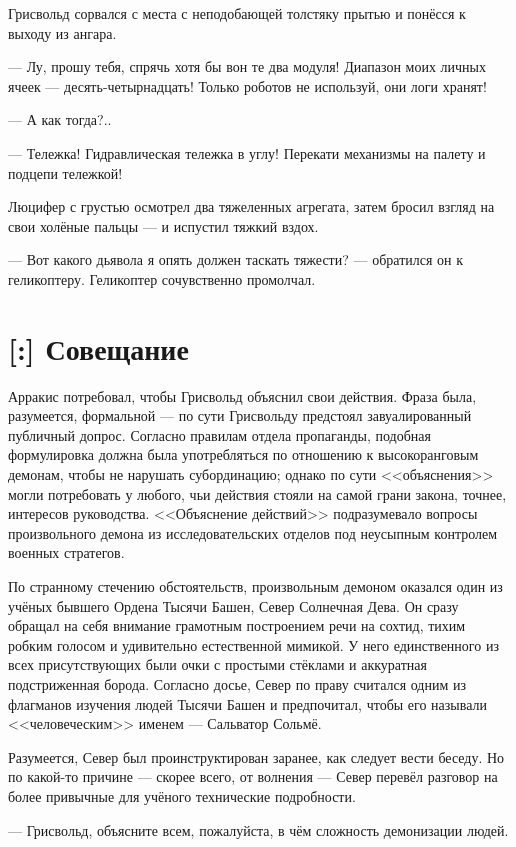 Грисвольд сорвался с места с неподобающей толстяку прытью и понёсся к выходу из ангара.

--- Лу, прошу тебя, спрячь хотя бы вон те два модуля!
Диапазон моих личных ячеек --- десять-четырнадцать!
Только роботов не используй, они логи хранят!

--- А как тогда?..

--- Тележка!
Гидравлическая тележка в углу!
Перекати механизмы на палету и подцепи тележкой!

Люцифер с грустью осмотрел два тяжеленных агрегата, затем бросил взгляд на свои холёные пальцы --- и испустил тяжкий вздох.

--- Вот какого дьявола я опять должен таскать тяжести? --- обратился он к геликоптеру.
Геликоптер сочувственно промолчал.

\section{[:] Совещание}

\textspace

Арракис потребовал, чтобы Грисвольд объяснил свои действия.
Фраза была, разумеется, формальной --- по сути Грисвольду предстоял завуалированный публичный допрос.
Согласно правилам отдела пропаганды, подобная формулировка должна была употребляться по отношению к высокоранговым демонам, чтобы не нарушать субординацию;
однако по сути <<объяснения>> могли потребовать у любого, чьи действия стояли на самой грани закона, точнее, интересов руководства.
<<Объяснение действий>> подразумевало вопросы произвольного демона из исследовательских отделов под неусыпным контролем военных стратегов.

По странному стечению обстоятельств, произвольным демоном оказался один из учёных бывшего Ордена Тысячи Башен, Север Солнечная Дева.
Он сразу обращал на себя внимание грамотным построением речи на сохтид, тихим робким голосом и удивительно естественной мимикой.
У него единственного из всех присутствующих были очки с простыми стёклами и аккуратная подстриженная борода.
Согласно досье, Север по праву считался одним из флагманов изучения людей Тысячи Башен и предпочитал, чтобы его называли <<человеческим>> именем --- Сальватор Сольмё.

Разумеется, Север был проинструктирован заранее, как следует вести беседу.
Но по какой-то причине --- скорее всего, от волнения --- Север перевёл разговор на более привычные для учёного технические подробности.

--- Грисвольд, объясните всем, пожалуйста, в чём сложность демонизации людей.

